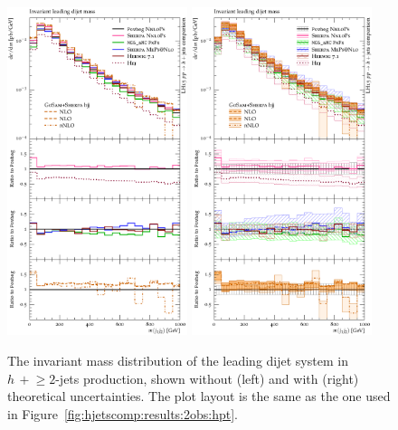 \begin{figure}[t!]
  \centering
  \includegraphics[width=0.47\textwidth]{figures/hjetscomp_u_dijet_mass.pdf}
  \hfill
  \includegraphics[width=0.47\textwidth]{figures/hjetscomp_dijet_mass.pdf}
  \caption{\label{fig:hjetscomp:results:2obs:mjj}%
    The invariant mass distribution of the leading dijet system in
    $h\,+\!\ge\!2$-jets production, shown without (left) and with (right)
    theoretical uncertainties. The plot layout is the same as the one
    used in Figure~\ref{fig:hjetscomp:results:2obs:hpt}.}
\end{figure}

